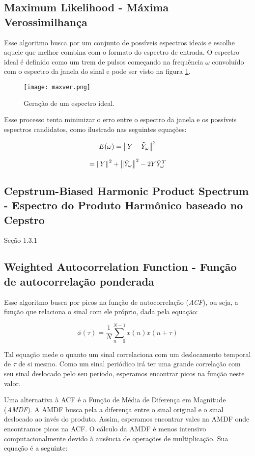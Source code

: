\subsection{Maximum Likelihood - Máxima Verossimilhança}

Esse algoritmo busca por um conjunto de possíveis espectros ideais e escolhe aquele que melhor combina com o formato do espectro de entrada. O espectro ideal é definido como um trem de pulsos começando na frequência $\omega$ convoluído com o espectro da janela do sinal e pode ser visto na figura \ref{fig:maxver}.

     \begin{figure}%
\centering
\texttt{[image: maxver.png]}
\caption{Geração de um espectro ideal.}
\label{fig:maxver}
\end{figure}

Esse processo tenta minimizar o erro entre o espectro da janela e os possíveis espectros candidatos, como ilustrado nas seguintes equações:

$$E(\omega) = \left\lVert Y - \tilde{Y}_\omega\right\rVert^{2}$$

$$= \left\lVert Y\right\rVert^{2} + \left\lVert\tilde{Y}_\omega\right\rVert^{2} - 2Y\tilde{Y}_\omega^{T}$$


\subsection{Cepstrum-Biased Harmonic Product Spectrum - Espectro do Produto Harmônico baseado no Cepstro}

\cite{master2000speech} Seção 1.3.1

\subsection{Weighted Autocorrelation Function - Função de autocorrelação ponderada}

Esse algoritmo busca por picos na função de autocorrelação (\emph{ACF}), ou seja, a função que relaciona o sinal com ele próprio, dada pela equação:

$$\phi(\tau) = \frac{1}{N}\sum_{n=0}^{N-1}x(n)x(n+\tau)$$

Tal equação mede o quanto um sinal correlaciona com um deslocamento temporal de $\tau$ de si mesmo.
Como um sinal periódico irá ter uma grande correlação com seu sinal deslocado pelo seu período, esperamos encontrar picos na função neste valor.

Uma alternativa à ACF é a Função de Média de Diferença em Magnitude (\emph{AMDF}). A AMDF busca pela a diferença entre o sinal original e o sinal deslocado ao invés do produto. Assim, esperamos encontrar vales na AMDF onde encontramos picos na ACF. O cálculo da AMDF é menos intensivo computacionalmente devido à ausência de operações de multiplicação.
Sua equação é a seguinte:

